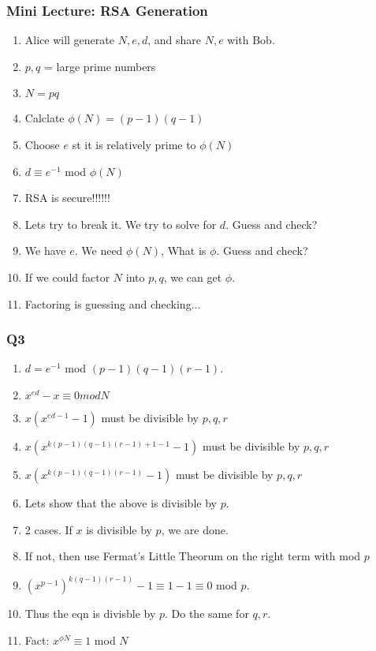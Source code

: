 \documentclass{beamer}
\newcommand{\xmark}{\ding{55}}
\begin{document}
\begin{frame}
    \frametitle{Mini Lecture: RSA Generation}

    \begin{enumerate}[<+->]
        \item Alice will generate $N, e, d$, and share $N, e$ with Bob.
        \item $p, q$ = large prime numbers
        \item $N = pq$
        \item Calclate $\phi(N) = (p - 1)(q -1)$
        \item Choose $e$ st it is relatively prime to $\phi(N)$
        \item $d \equiv e^{-1}$ mod $\phi(N)$
        \item \alert{RSA is secure!!!!!!}
        \item Lets try to break it. We try to solve for $d$. Guess and check? \xmark
        \item We have $e$. We need $\phi(N)$, What is $\phi$. Guess and check? \xmark
        \item If we could factor $N$ into $p,q$, we can get $\phi$. 
        \item Factoring is guessing and checking... \xmark
    \end{enumerate}

\end{frame}

\begin{frame}
    \frametitle{Q3}

    \begin{enumerate}[<+->]
        \item $d = e^{-1}$ mod $(p-1)(q-1)(r-1)$. 
        \item $x^{ed} - x \equiv 0 mod N$
        \item $x(x^{ed - 1} - 1)$ must be divisible by $p, q, r$
        \item $x(x^{k(p-1)(q-1)(r-1) + 1 - 1} - 1)$ must be divisible by $p, q, r$
        \item $x(x^{k(p-1)(q-1)(r-1)} - 1)$ must be divisible by $p, q, r$
        \item Lets show that the above is divisible by $p$.
        \item 2 cases. If $x$ is divisible by $p$, we are done.
        \item If not, then use Fermat's Little Theorum on the right term with mod $p$
        \item $(x^{p-1})^{k(q-1)(r-1)} - 1 \equiv 1 - 1 \equiv 0$ mod $p$.
        \item Thus the eqn is divisble by $p$. Do the same for $q, r$.
        \item \alert{Fact:} $x^{\phi{N}} \equiv 1$ mod $N$
    \end{enumerate}

\end{frame}
\end{document}
